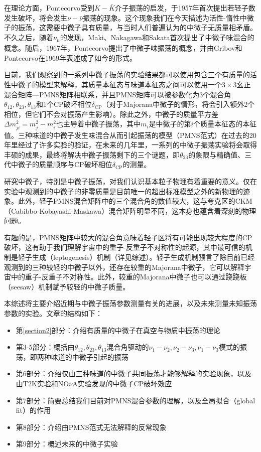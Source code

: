 \documentclass{article}
\begin{document}
	在理论方面，Pontecorvo受到$K-\bar{K}$介子振荡的启发，于1957年首次提出若轻子数发生破坏，将会发生$\nu-\bar{\nu}$振荡的现象\cite{Pontecorvo1957}\cite{Pontecorvo1958b}。这个现象我们在今天描述为活性-惰性中微子的振荡，这需要中微子具有质量，与当时人们普遍认为的中微子无质量相矛盾。不久之后，随着$\nu_\mu$的发现，Maki、Nakagawa和Sakata首次提出了中微子味混合的概念\cite{Maki1962}。随后，1967年，Pontecorvo提出了中微子味振荡的概念\cite{Pontecorvo1967}，并由Gribov和Pontecorvo在1969年表述成了如今的形式\cite{Gribov1969}。
	
	目前，我们观察到的一系列中微子振荡的实验结果都可以使用包含三个有质量的活性中微子的模型来解释，其质量本征态与味道本征态之间可以使用一个$3\times3$幺正混合矩阵—PMNS矩阵相联系，并且PMNS矩阵可以被参数化为3个混合角$\theta_{12},\theta_{23},\theta_{13}$和1个CP破坏相位$\delta_\mathrm{CP}$（对于Majorana中微子的情形，将会引入额外2个相位，但它们不会对振荡产生影响）。除此之外，中微子的质量平方差$\Delta m_{ji}^2=m_j^2-m_i^2$也主导着中微子振荡，其中$m_i$是中微子的第$i$个质量本征态的本征值。三种味道的中微子发生味混合从而引起振荡的模型（PMNS范式）在过去的20年里经过了许多实验的验证，在未来的几年里，一系列的中微子振荡实验将会取得丰硕的成果，最终将解决中微子振荡剩下的三个谜题，即$\theta_{23}$的象限与精确值、三代中微子的质量顺序与CP破坏相位$\delta_\mathrm{CP}$的测量。
	
	研究中微子，特别是中微子振荡，对我们认识基本粒子物理有着重要的意义。仅在实验中观测到的中微子的非零质量是目前唯一的超出标准模型之外的新物理的迹象\cite{Mohapatra2007}。此外，轻子PMNS混合矩阵中的三个混合角的数值较大，这与夸克区的CKM（Cabibbo-Kobayashi-Maskawa）混合矩阵\cite{Cabibbo1963}\cite{Kobayashi1973}明显不同，这本身也蕴含着深刻的物理问题。
	
	有趣的是，PMNS矩阵中较大的混合角意味着轻子区将有可能出现较大程度的CP破坏，这有助于我们理解宇宙中的重子-反重子不对称性的起源，其中最可信的机制是轻子生成（leptogenesis）机制\cite{Fukugita1986}（详见综述\cite{Davidson2008}）。轻子生成机制预言了除目前已经观测到的三种较轻的中微子以外，还存在较重的Majorana中微子，它可以解释宇宙中的重子-反重子不对称性。此外，较重的Majorana中微子也可以通过跷跷板（seesaw）机制赋予较轻的中微子质量\cite{Minkowski1977}\cite{GellMann1979}\cite{Yanagida1979}\cite{Glashow1980}\cite{Mohapatra1980}。
	
	本综述将主要介绍近期与中微子振荡参数测量有关的进展，以及未来测量未知振荡参数的实验。文章的结构如下：
	\begin{itemize}
		\item 第\ref{section2}部分：介绍有质量的中微子在真空与物质中振荡的理论
		\item 第3-5部分：概括由$\theta_{12},\theta_{23},\theta_{13}$混合角驱动的$\nu_1-\nu_2,\nu_2-\nu_3,\nu_1-\nu_3$模式的振荡，即两种味道的中微子引起的振荡
		\item 第6部分：介绍仅由三种味道的中微子共同振荡才能够解释的实验现象，以及由T2K实验和NO$\nu$A实验发现的中微子CP破坏效应
		\item 第7部分：简要总结我们目前对PMNS混合参数的理解，以及全局拟合（global fit）的作用
		\item 第8部分：介绍由PMNS范式无法解释的反常现象
		\item 第9部分：概述未来的中微子实验
	\end{itemize}
	
\end{document}
